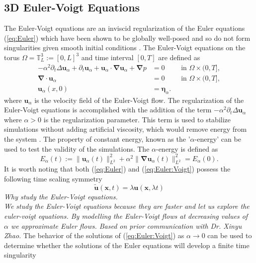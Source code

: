 \documentclass[12pt]{article}
\newcommand{\bds}{\boldsymbol}
\def\u{\boldsymbol u}
\def\ua{\boldsymbol u_\alpha}
\def\bn{\boldsymbol \nabla}
\def\bea{\boldsymbol \eta_\alpha}
\numberwithin{equation}{section}
\begin{document}
\subsection{3D Euler-Voigt Equations}
The Euler-Voigt equations are an inviscid regularization of the Euler equations (\ref{eq:Euler}) which have been shown to be globally well-posed and so do not form singularities given smooth initial conditions \cite{cao_global_2006}. The Euler-Voigt equations on the torus $\Omega = \mathbb{T}_L^3 := [0,L]^3$ and time interval $[0,T]$ are defined as
\begin{subequations}\label{eq:Euler:Voigt}
\begin{align}
-\alpha^2\partial_t\Delta\ua + \partial_t \ua + \ua\cdot \bn\ua + \bn p &= 0 \qquad\text{ in } \Omega\times (0,T],\\ 
\bn \cdot \ua &= 0 \qquad\text{ in } \Omega\times (0,T],\\
\ua(x,0) &= \bea.
\end{align}
\end{subequations}
where $\ua$ is the velocity field of the Euler-Voigt flow. The regularization of the Euler-Voigt equations is accomplished with the addition of the term $-\alpha^2\partial_t \Delta \ua$ where $\alpha >0$ is the regularization parameter. This term is used to stabilize simulations without adding artificial viscosity, which would remove energy from the system \cite{larios_computational_2018}. The property of constant energy, known as the '$\alpha$-energy' can be used to test the validity of the simulations. The $\alpha$-energy is defined as
\begin{equation}\label{eq:alpha:Energy}
E_\alpha(t):=\|\ua(t)\|_{L^2}^2 + \alpha^2\|\bn\ua(t)\|_{L^2}^2 = E_\alpha(0).
\end{equation}
It is worth noting that both (\ref{eq:Euler}) and (\ref{eq:Euler:Voigt}) possess the following time scaling symmetry
\begin{equation}\label{eq:time:scaling}
\tilde{\u}(\bds x,t) = \lambda\u(\bds x,\lambda t)
\end{equation}
\textit{Why study the Euler-Voigt equations.\\
We study the Euler-Voigt equations because they are faster and let us explore the euler-voigt equations. By modelling the Euler-Voigt flows at decreasing values of $\alpha$ we approximate Euler flows. Based on prior communication with Dr. Xinyu Zhao.} The behavior of the solutions of (\ref{eq:Euler:Voigt}) as $\alpha\rightarrow 0$ can be used to determine whether the solutions of the Euler equations will develop a finite time singularity \cite{larios_computational_2018}
\end{document}
